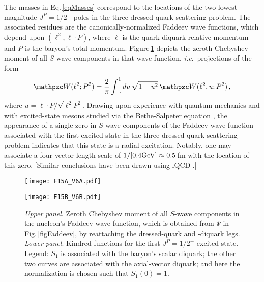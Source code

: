 The masses in Eq.\,\eqref{eqMasses} correspond to the locations of the two lowest-magnitude $J^P=1/2^+$ poles in the three dressed-quark scattering problem.  The associated residues are the canonically-normalized Faddeev wave functions, which depend upon $(\ell^2,\ell \cdot P)$, where $\ell$ is the quark-diquark relative momentum and $P$ is the baryon's total momentum.  Figure\,\ref{figFA} depicts the zeroth Chebyshev moment of all $S$-wave components in that wave function, \emph{i.e}.\ projections of the form
\begin{equation}
{\mathpzc W}(\ell^2;P^2) = \frac{2}{\pi} \int_{-1}^1 \! du\,\sqrt{1-u^2}\,
{\mathpzc W}(\ell^2,u; P^2)\,,
\end{equation}
where $u=\ell\cdot P/\sqrt{\ell^2 P^2}$.  Drawing upon experience with quantum mechanics and with excited-state mesons studied via the Bethe-Salpeter equation \cite{Holl:2004fr, Qin:2011xq, Rojas:2014aka}, the appearance of a single zero in $S$-wave components of the Faddeev wave function associated with the first excited state in the three dressed-quark scattering problem indicates that this state is a radial excitation.  Notably, one may associate a four-vector length-scale of $1/[0.4 {\rm GeV}]\approx 0.5\,$fm with the location of this zero.
[Similar conclusions have been drawn using lQCD \cite{Roberts:2013ipa}.]

\begin{figure}[!t]
%
\centerline{%
\texttt{[image: F15A\_V6A.pdf]}}
\vspace*{1ex}

\centerline{%
\texttt{[image: F15B\_V6B.pdf]}}
%
%
\caption{\label{figFA}
%
\emph{Upper panel}.  Zeroth Chebyshev moment of all $S$-wave components in the nucleon's Faddeev wave function, which is obtained from $\Psi$ in Fig.\,\ref{figFaddeev}, by reattaching the dressed-quark and -diquark legs.
%
\emph{Lower panel}.  Kindred functions for the first $J^P=1/2^+$ excited state.
%
Legend: $S_1$ is associated with the baryon's scalar diquark; the other two curves are associated with the axial-vector diquark; and here the normalization is chosen such that $S_1(0)=1$.}
\end{figure}

